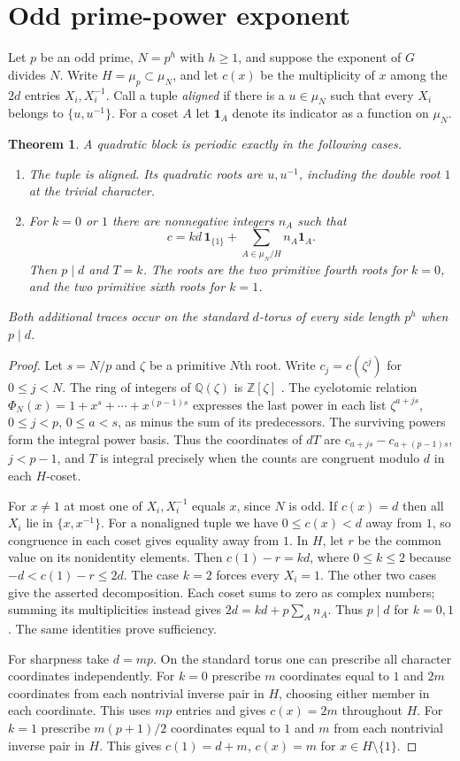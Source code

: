 \documentclass[10pt]{article}
\newtheorem{theorem}{Theorem}
\newcommand{\Z}{\mathbb Z}
\newcommand{\Q}{\mathbb Q}
\begin{document}
\section{Odd prime-power exponent}
Let $p$ be an odd prime, $N=p^h$ with $h\ge1$, and suppose the exponent
of $G$ divides $N$. Write $H=\mu_p\subset\mu_N$, and let $c(x)$ be the
multiplicity of $x$ among the $2d$ entries $X_i,X_i^{-1}$. Call a tuple
\emph{aligned} if there is a $u\in\mu_N$ such that every $X_i$ belongs
to $\{u,u^{-1}\}$. For a coset $A$ let $\boldsymbol1_A$ denote its
indicator as a function on $\mu_N$.
\begin{theorem}\label{t:main}
A quadratic block is periodic exactly in the following cases.
\begin{enumerate}
\item The tuple is aligned. Its quadratic roots are $u,u^{-1}$, including
the double root $1$ at the trivial character.
\item For $k=0$ or $1$ there are nonnegative integers $n_A$ such that
\[
 c=kd\,\boldsymbol1_{\{1\}}+\sum_{A\in\mu_N/H} n_A\boldsymbol1_A .
\]
Then $p\mid d$ and $T=k$. The roots are the two primitive fourth roots for
$k=0$, and the two primitive sixth roots for $k=1$.
\end{enumerate}
Both additional traces occur on the standard $d$-torus of every side
length $p^h$ when $p\mid d$.
\end{theorem}
\begin{proof}
Let $s=N/p$ and $\zeta$ be a primitive $N$th root. Write
$c_j=c(\zeta^j)$ for $0\le j<N$. The ring of integers of $\Q(\zeta)$
is $\Z[\zeta]$ \cite[Chapter~2]{washington}. The cyclotomic relation
$\Phi_N(x)=1+x^s+\cdots+x^{(p-1)s}$ expresses the last power in
each list $\zeta^{a+js}$, $0\le j<p$, $0\le a<s$, as minus the
sum of its predecessors. The surviving powers form the integral power
basis. Thus the coordinates of $dT$ are
$c_{a+js}-c_{a+(p-1)s}$, $j<p-1$, and $T$ is integral precisely when
the counts are congruent modulo $d$ in each $H$-coset.

For $x\ne1$ at most one of $X_i,X_i^{-1}$ equals $x$, since $N$ is
odd. If $c(x)=d$ then all $X_i$ lie in $\{x,x^{-1}\}$.
For a nonaligned tuple we have $0\le c(x)<d$ away from $1$, so
congruence in each coset gives equality away from $1$. In $H$, let $r$
be the common value on its nonidentity elements.
Then $c(1)-r=kd$, where $0\le k\le2$ because $-d<c(1)-r\le2d$.
The case $k=2$ forces every $X_i=1$. The other two cases give the
asserted decomposition. Each coset sums to zero as complex numbers;
summing its multiplicities instead gives $2d=kd+p\sum_A n_A$.
Thus $p\mid d$ for $k=0,1$. The same identities prove sufficiency.

For sharpness take $d=mp$. On the standard torus one can prescribe all
character coordinates independently. For $k=0$ prescribe $m$ coordinates
equal to $1$ and $2m$ coordinates from each nontrivial inverse pair in
$H$, choosing either member in each coordinate. This uses $mp$ entries
and gives $c(x)=2m$ throughout $H$. For $k=1$ prescribe
$m(p+1)/2$ coordinates equal to $1$ and $m$ from each nontrivial inverse
pair in $H$. This gives $c(1)=d+m$, $c(x)=m$ for $x\in H\setminus\{1\}$.
\end{proof}
\end{document}
